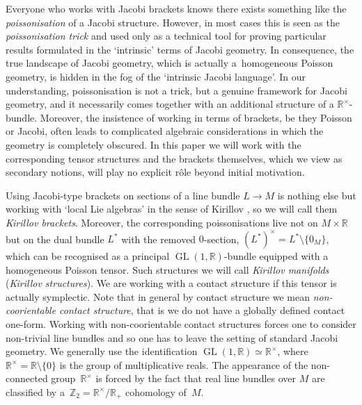 \documentclass[10pt,a4paper]{amsart}
\DeclareMathOperator{\GL}{GL}
\newcommand{\R}{{\mathbb R}}
\newcommand{\ti}{\times}
\def\Rt{{\R^\times}}
\numberwithin{equation}{section}
\begin{document}
Everyone who works with Jacobi brackets knows there exists something like the \emph{poissonisation} of a Jacobi structure. However, in most cases this is seen as the \emph{poissonisation trick} and used only as a technical tool for proving particular results formulated in the `intrinsic' terms of Jacobi geometry. In consequence, the true landscape of Jacobi geometry, which is actually a~homogeneous Poisson geometry, is hidden in the fog of the `intrinsic Jacobi language'. In our understanding, poissonisation is not a trick, but a genuine framework for Jacobi geometry, and it necessarily comes together with an additional structure of a $\Rt$-bundle. Moreover, the insistence of working in terms of brackets, be they Poisson or Jacobi, often leads to complicated algebraic considerations in which the geometry is completely obscured. In this paper we will work with the corresponding tensor structures and the brackets themselves, which we view as secondary notions, will play no explicit r\^{o}le beyond initial motivation.

Using Jacobi-type brackets on sections of a line bundle $L\to M$ is nothing else but working with `local Lie algebras' in the sense of Kirillov \cite{Kirillov:1976}, so we will call them \emph{Kirillov brackets}. Moreover, the corresponding poissonisations live not on $M\ti\R$ but on the dual bundle $L^*$ with the removed $0$-section, $(L^*)^\ti=L^*\setminus\{ 0_M\}$, which can be recognised as a principal $\GL(1,\R)$-bundle equipped with a homogeneous Poisson tensor. Such structures we will call \emph{Kirillov manifolds} (\emph{Kirillov structures}). We are working with a contact structure if this tensor is actually symplectic. Note that in general by contact structure we mean \emph{non-coorientable contact structure}, that is we do not have a globally def\/ined contact one-form. Working with non-coorientable contact structures forces one to consider non-trivial line bundles and so one has to leave the setting of standard Jacobi geometry. We generally use the identif\/ication $\GL(1,\R)\simeq\R^\times$, where $\R^\times=\R\setminus\{ 0\}$ is the group of multiplicative reals. The appearance of the non-connected group~$\R^\ti$ is forced by the fact that real line bundles over $M$ are classif\/ied by a~$\mathbb{Z}_2=\R^\ti/\R_+$ cohomology of~$M$.
\end{document}
